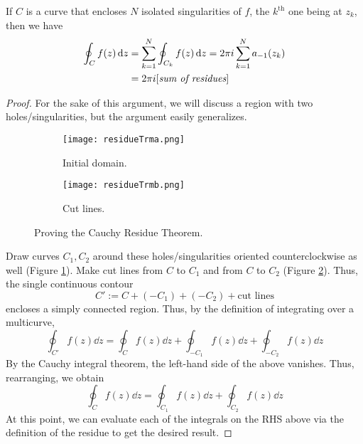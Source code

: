 \documentclass[titlepage]{article}
\numberwithin{equation}{section}
\begin{document}
\begin{theorem}\label{trm:residue}
    If $C$ is a curve that encloses $N$ isolated singularities of $f$, the $k^\text{th}$ one being at $z_k$, then we have
    \begin{align*}
        \oint_Cf(z)\dd{z} &= \sum_{k=1}^N\oint_{C_k}f(z)\dd{z}
            = 2\pi i\sum_{k=1}^Na_{-1}(z_k)\\
        &= 2\pi i[\emph{sum of residues}]
    \end{align*}
    \begin{proof}
        For the sake of this argument, we will discuss a region with two holes/singularities, but the argument easily generalizes.
        \begin{figure}[H]
            \centering
            \begin{subfigure}[b]{0.4\linewidth}
                \centering
                \texttt{[image: residueTrma.png]}
                \caption{Initial domain.}
                \label{fig:residueTrma}
            \end{subfigure}
            \begin{subfigure}[b]{0.4\linewidth}
                \centering
                \texttt{[image: residueTrmb.png]}
                \caption{Cut lines.}
                \label{fig:residueTrmb}
            \end{subfigure}
            \caption{Proving the Cauchy Residue Theorem.\protect\footnotemark}
            \label{fig:residueTrm}
        \end{figure}
        Draw curves $C_1,C_2$ around these holes/singularities oriented counterclockwise as well (Figure \ref{fig:residueTrma}). Make cut lines from $C$ to $C_1$ and from $C$ to $C_2$ (Figure \ref{fig:residueTrmb}). Thus, the single continuous contour
        \begin{equation*}
            C' := C+(-C_1)+(-C_2)+\text{cut lines}
        \end{equation*}
        encloses a simply connected region. Thus, by the definition of integrating over a multicurve,
        \begin{equation*}
            \oint_{C'}f(z)\dd{z} = \oint_Cf(z)\dd{z}+\oint_{-C_1}f(z)\dd{z}+\oint_{-C_2}f(z)\dd{z}
        \end{equation*}
        By the Cauchy integral theorem, the left-hand side of the above vanishes. Thus, rearranging, we obtain
        \begin{equation*}
            \oint_Cf(z)\dd{z} = \oint_{C_1}f(z)\dd{z}+\oint_{C_2}f(z)\dd{z}
        \end{equation*}
        At this point, we can evaluate each of the integrals on the RHS above via the definition of the residue to get the desired result.
    \end{proof}
\end{theorem}
\end{document}
